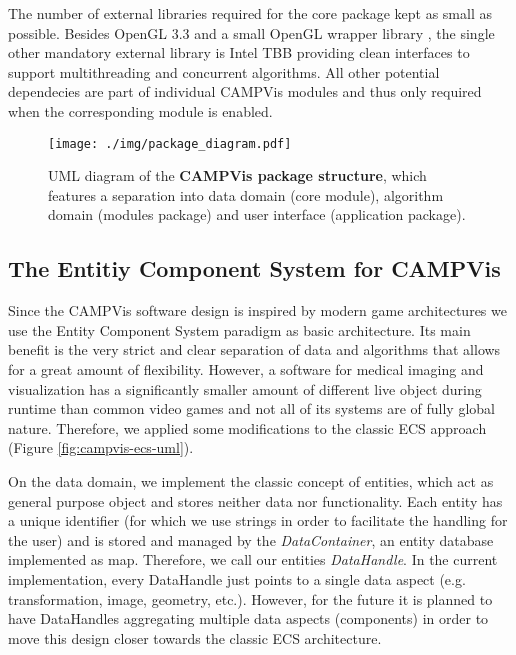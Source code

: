 The number of external libraries required for the core package kept as small as possible.
Besides OpenGL 3.3 and a small OpenGL wrapper library \cite{tgt}, the single other mandatory external library is Intel TBB \cite{inteltbb} providing clean interfaces to support multithreading and concurrent algorithms.
All other potential dependecies are part of individual CAMPVis modules and thus only required when the corresponding module is enabled.

\begin{figure}[htb]
	\centering
	\texttt{[image: ./img/package\_diagram.pdf]}
	\caption{
		UML diagram of the \textbf{CAMPVis package structure}, which features a separation into data domain (core module), algorithm domain (modules package) and user interface (application package).
	}
	\label{fig:macrostructure}
\end{figure}



\subsection{The Entitiy Component System for CAMPVis}

Since the CAMPVis software design is inspired by modern game architectures we use the Entity Component System paradigm as basic architecture.
Its main benefit is the very strict and clear separation of data and algorithms that allows for a great amount of flexibility.
However, a software for medical imaging and visualization has a significantly smaller amount of different live object during runtime than common video games and not all of its systems are of fully global nature.
Therefore, we applied some modifications to the classic ECS approach (Figure \ref{fig:campvis-ecs-uml}).

On the data domain, we implement the classic concept of entities, which act as general purpose object and stores neither data nor functionality.
Each entity has a unique identifier (for which we use strings in order to facilitate the handling for the user) and is stored and managed by the \emph{DataContainer}, an entity database implemented as map.
Therefore, we call our entities \emph{DataHandle}.
In the current implementation, every DataHandle just points to a single data aspect (e.g. transformation, image, geometry, etc.).
However, for the future it is planned to have DataHandles aggregating multiple data aspects (components) in order to move this design closer towards the classic ECS architecture.

